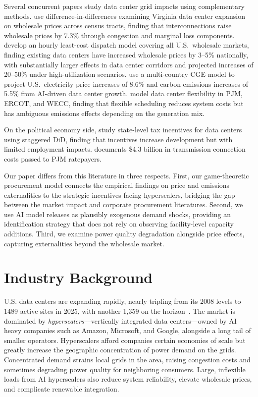 \documentclass[a4paper,fleqn,longmktitle]{cas-sc}
\newcommand{\nb}[1]{\textcolor{blue}{NB[#1]}}
\begin{document}
Several concurrent papers study data center grid impacts using complementary methods. \citet{mamkhezri2025} use difference-in-differences examining Virginia data center expansion on wholesale prices across census tracts, finding that interconnections raise wholesale prices by 7.3\% through congestion and marginal loss components. \citet{kay2026} develop an hourly least-cost dispatch model covering all U.S.\ wholesale markets, finding existing data centers have increased wholesale prices by 3--5\% nationally, with substantially larger effects in data center corridors and projected increases of 20--50\% under high-utilization scenarios. \citet{bogmans2025} use a multi-country CGE model to project U.S.\ electricity price increases of 8.6\% and carbon emissions increases of 5.5\% from AI-driven data center growth. \citet{knittel2025} model data center flexibility in PJM, ERCOT, and WECC, finding that flexible scheduling reduces system costs but has ambiguous emissions effects depending on the generation mix.
 
On the political economy side, \citet{gargano2025} study state-level tax incentives for data centers using staggered DiD, finding that incentives increase development but with limited employment impacts. \citet{jacobs2025} documents \$4.3 billion in transmission connection costs passed to PJM ratepayers.
 
Our paper differs from this literature in three respects. First, our game-theoretic procurement model connects the empirical findings on price and emissions externalities to the strategic incentives facing hyperscalers, bridging the gap between the market impact and corporate procurement literatures. Second, we use AI model releases as plausibly exogenous demand shocks, providing an identification strategy that does not rely on observing facility-level capacity additions. Third, we examine power quality degradation alongside price effects, capturing externalities beyond the wholesale market.
 

\section{Industry Background}
U.S. data centers are expanding rapidly, nearly tripling from its 2008 levels to 1489 active sites in 2025, with another 1,359 on the horizon~\cite{aterio_us_data_centers_2025}. The market is dominated by \emph{hyperscalers}---vertically integrated data centers---owned by AI heavy companies such as Amazon, Microsoft, and Google, alongside a long tail of smaller operators. Hyperscalers afford companies certain economies of scale but greatly increase the geographic concentration of power demand on the grids. Concentrated demand strains local grids in the area, raising congestion costs and sometimes degrading power quality for neighboring consumers. Large, inflexible loads from AI hyperscalers also reduce system reliability, elevate wholesale prices, and complicate renewable integration.
\end{document}
